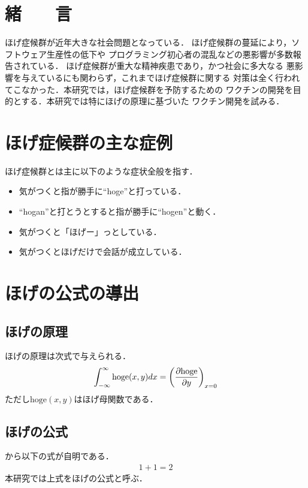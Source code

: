 \begin{small}
\section{緒　　言}
ほげ症候群が近年大きな社会問題となっている\cite{Ikuo:doctor}．
ほげ症候群の蔓延により，ソフトウェア生産性の低下や
プログラミング初心者の混乱などの悪影響が多数報告されている．
ほげ症候群が重大な精神疾患であり，かつ社会に多大なる
悪影響を与えているにも関わらず，これまでほげ症候群に関する
対策は全く行われてこなかった．本研究では，ほげ症候群を予防するための
ワクチンの開発を目的とする．本研究では特にほげの原理に基づいた
ワクチン開発を試みる．
\section{ほげ症候群の主な症例}
ほげ症候群とは主に以下のような症状全般を指す\cite{Hondo:hohoge2006}．
\begin{itemize}
\item 気がつくと指が勝手に``hoge''と打っている．
\item ``hogan''と打とうとすると指が勝手に``hogen''と動く．
\item 気がつくと「ほげー」っとしている．
\item 気がつくとほげだけで会話が成立している．
\end{itemize}

\section{ほげの公式の導出}
\subsection{ほげの原理}

ほげの原理は次式で与えられる\cite{Kawamura:hogege2010}．
\begin{eqnarray}
\int_{-\infty}^\infty \mathrm{hoge}(x,y) dx = \left( \pdiff{\mathrm{hoge}}{y} \right)_{x = 0}
\equlabel{hoge}
\end{eqnarray}
ただし$\mathrm{hoge}(x,y)$はほげ母関数である．

\subsection{ほげの公式}
から以下の式が自明である．
\begin{eqnarray}
1 + 1 = 2
\end{eqnarray}
本研究では上式をほげの公式と呼ぶ．


\end{small}
